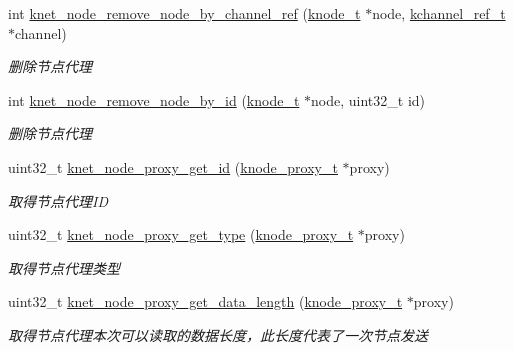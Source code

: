 \begin{DoxyCompactItemize}
int \hyperlink{a00101_a8e76a4e4b505064bc36779f415bf1b98_a8e76a4e4b505064bc36779f415bf1b98}{knet\+\_\+node\+\_\+remove\+\_\+node\+\_\+by\+\_\+channel\+\_\+ref} (\hyperlink{a00066_a5e720b27efbc9ad744240f5f4233763a_a5e720b27efbc9ad744240f5f4233763a}{knode\+\_\+t} $\ast$node, \hyperlink{a00066_a3b7e82599367eade261456f60ebe2cd9_a3b7e82599367eade261456f60ebe2cd9}{kchannel\+\_\+ref\+\_\+t} $\ast$channel)
\begin{DoxyCompactList}\small\item\em 删除节点代理 \end{DoxyCompactList}\item 
int \hyperlink{a00101_afd42a88def40617892cb161ebee49a8b_afd42a88def40617892cb161ebee49a8b}{knet\+\_\+node\+\_\+remove\+\_\+node\+\_\+by\+\_\+id} (\hyperlink{a00066_a5e720b27efbc9ad744240f5f4233763a_a5e720b27efbc9ad744240f5f4233763a}{knode\+\_\+t} $\ast$node, uint32\+\_\+t id)
\begin{DoxyCompactList}\small\item\em 删除节点代理 \end{DoxyCompactList}\item 
uint32\+\_\+t \hyperlink{a00135_ga55eac38f861266b225e686fe86294b18_ga55eac38f861266b225e686fe86294b18}{knet\+\_\+node\+\_\+proxy\+\_\+get\+\_\+id} (\hyperlink{a00066_a5025c3e4422f5f55b981aad6e56b6d89_a5025c3e4422f5f55b981aad6e56b6d89}{knode\+\_\+proxy\+\_\+t} $\ast$proxy)
\begin{DoxyCompactList}\small\item\em 取得节点代理\+I\+D \end{DoxyCompactList}\item 
uint32\+\_\+t \hyperlink{a00135_gaa2890b2f9fe57b8f45677da321350f41_gaa2890b2f9fe57b8f45677da321350f41}{knet\+\_\+node\+\_\+proxy\+\_\+get\+\_\+type} (\hyperlink{a00066_a5025c3e4422f5f55b981aad6e56b6d89_a5025c3e4422f5f55b981aad6e56b6d89}{knode\+\_\+proxy\+\_\+t} $\ast$proxy)
\begin{DoxyCompactList}\small\item\em 取得节点代理类型 \end{DoxyCompactList}\item 
uint32\+\_\+t \hyperlink{a00135_gaaa6781024365a8c19e4113b5a1c5a291_gaaa6781024365a8c19e4113b5a1c5a291}{knet\+\_\+node\+\_\+proxy\+\_\+get\+\_\+data\+\_\+length} (\hyperlink{a00066_a5025c3e4422f5f55b981aad6e56b6d89_a5025c3e4422f5f55b981aad6e56b6d89}{knode\+\_\+proxy\+\_\+t} $\ast$proxy)
\begin{DoxyCompactList}\small\item\em 取得节点代理本次可以读取的数据长度，此长度代表了一次节点发送 \end{DoxyCompactList}\item 

\end{DoxyCompactItemize}
